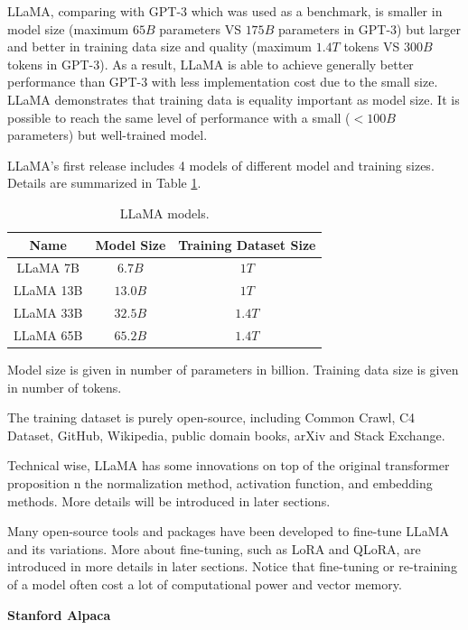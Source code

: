 LLaMA, comparing with GPT-3 which was used as a benchmark, is smaller in model size (maximum $65B$ parameters VS $175B$ parameters in GPT-3) but larger and better in training data size and quality (maximum $1.4T$ tokens VS $300B$ tokens in GPT-3). As a result, LLaMA is able to achieve generally better performance than GPT-3 with less implementation cost due to the small size. LLaMA demonstrates that training data is equality important as model size. It is possible to reach the same level of performance with a small ($<100B$ parameters) but well-trained model.

LLaMA's first release includes 4 models of different model and training sizes. Details are summarized in Table \ref{ch:llm:tab:llamamodels}.
\begin{table}[!htb]
	\centering \caption{LLaMA models.}\label{ch:llm:tab:llamamodels}
	\begin{tabular}{ccc}
		\hline
		Name & Model Size & Training Dataset Size \\ \hline
		LLaMA 7B & $6.7B$ & $1T$ \\
		LLaMA 13B & $13.0B$ & $1T$ \\
		LLaMA 33B & $32.5B$ & $1.4T$ \\
		LLaMA 65B & $65.2B$ & $1.4T$ \\
		\hline
	\end{tabular}
	\begin{flushleft}
		\footnotesize
		Model size is given in number of parameters in billion. Training data size is given in number of tokens.
	\end{flushleft}
\end{table}
The training dataset is purely open-source, including Common Crawl, C4 Dataset, GitHub, Wikipedia, public domain books, arXiv and Stack Exchange.

Technical wise, LLaMA has some innovations on top of the original transformer proposition \cite{vaswani2017attention} n the normalization method, activation function, and embedding methods. More details will be introduced in later sections.

Many open-source tools and packages have been developed to fine-tune LLaMA and its variations. More about fine-tuning, such as LoRA\cite{hu2021lora} and QLoRA\cite{dettmers2023qlora}, are introduced in more details in later sections. Notice that fine-tuning or re-training of a model often cost a lot of computational power and vector memory.

\vspace{0.1in}
\noindent \textbf{Stanford Alpaca}
\vspace{0.1in}

